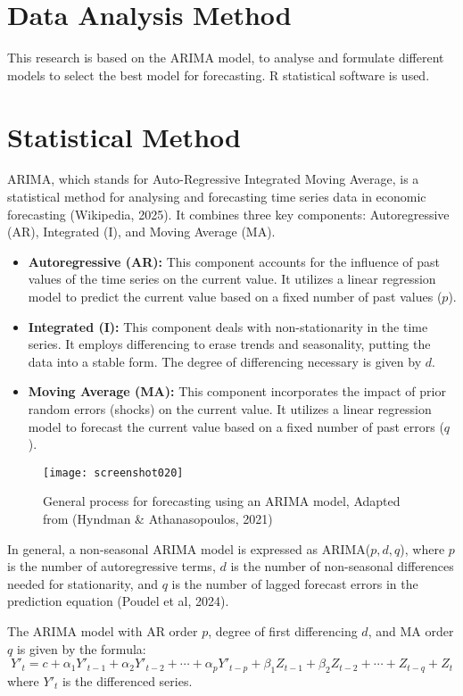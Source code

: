 \documentclass[12pt,a4paper]{report} %
\begin{document}
\section{Data Analysis Method}
This research is based on the ARIMA model, to analyse and formulate different models to select the best model for forecasting. R statistical software is used.

\section{Statistical Method}
ARIMA, which stands for Auto-Regressive Integrated Moving Average, is a statistical method for analysing and forecasting time series data in economic forecasting (Wikipedia, 2025). It combines three key components: Autoregressive (AR), Integrated (I), and Moving Average (MA).
\begin{itemize}
	\item \textbf{Autoregressive (AR):} This component accounts for the influence of past values of the time series on the current value. It utilizes a linear regression model to predict the current value based on a fixed number of past values ($p$).
	\item \textbf{Integrated (I):} This component deals with non-stationarity in the time series. It employs differencing to erase trends and seasonality, putting the data into a stable form. The degree of differencing necessary is given by $d$.
	\item \textbf{Moving Average (MA):} This component incorporates the impact of prior random errors (shocks) on the current value. It utilizes a linear regression model to forecast the current value based on a fixed number of past errors ($q$).
\end{itemize}

\begin{figure}[h!]
	\centering
	\texttt{[image: screenshot020]}
	\caption{General process for forecasting using an ARIMA model, Adapted from (Hyndman \& Athanasopoulos, 2021)}
	\label{fig:screenshot020}
\end{figure}

In general, a non-seasonal ARIMA model is expressed as ARIMA($p,d,q$), where $p$ is the number of autoregressive terms, $d$ is the number of non-seasonal differences needed for stationarity, and $q$ is the number of lagged forecast errors in the prediction equation (Poudel et al, 2024).

The ARIMA model with AR order $p$, degree of first differencing $d$, and MA order $q$ is given by the formula:
\[
Y'_t = c + \alpha_1 Y'_{t-1} + \alpha_2 Y'_{t-2} + \cdots + \alpha_p Y'_{t-p} + \beta_1 Z_{t-1} + \beta_2 Z_{t-2} + \cdots + Z_{t-q} + Z_t
\]
where $Y'_t$ is the differenced series.
\end{document}
